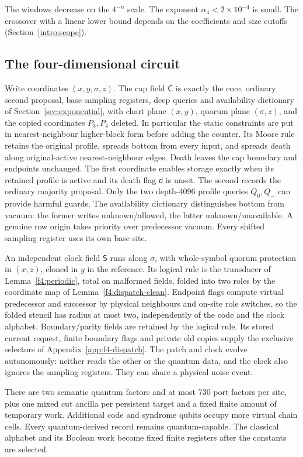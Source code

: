 The windows decrease on the \(4^{-n}\) scale. The exponent \(\alpha_4<2\times10^{-4}\) is small. The crossover with a linear lower bound depends on the coefficients and size cutoffs (Section~\ref{intro:scope}).

\subsection{The four-dimensional circuit}\label{f4:circuit}
Write coordinates \((x,y,\sigma,z)\). The cap field \(\mathsf C\)
is exactly the core, ordinary second proposal, base sampling registers, deep
queries and availability dictionary of Section~\ref{sec:exponential},
with chart plane \((x,y)\), quorum plane \((\sigma,z)\), and the
copied coordinates \(P_3,P_4\) deleted. In particular the static
constraints are put in nearest-neighbour higher-block form before
adding the counter. Its Moore rule retains the original profile, spreads
bottom from every input, and spreads death along original-active
nearest-neighbour edges. Death leaves the cap boundary and endpoints
unchanged. The first coordinate enables storage exactly when its retained profile is active and its death flag \(\mathsf d\) is unset. The second records the ordinary majority proposal. Only the two depth-4096 profile queries \(Q_0,Q_-\) can provide harmful guards. The availability dictionary distinguishes bottom from vacuum: the former writes unknown/allowed, the latter unknown/unavailable. A genuine row origin takes priority over predecessor vacuum. Every shifted sampling register uses its own base site.

An independent clock field \(\mathsf S\) runs along \(\sigma\),
with whole-symbol quorum protection in \((x,z)\), cloned in \(y\)
in the reference. Its logical rule is the transducer of
Lemma~\ref{f4:periodic}, total on malformed fields, folded into two
roles by the coordinate map of Lemma~\ref{f4:dispatch-clean}. Endpoint
flags compute virtual predecessor and successor by physical neighbours
and on-site role switches, so the folded stencil has radius at most two,
independently of the code and the clock alphabet. Boundary/parity
fields are retained by the logical rule. Its stored current request,
finite boundary flags and private old copies supply the exclusive
selectors of Appendix~\ref{app:f4-dispatch}.
The patch and clock evolve autonomously: neither reads the other or the quantum data, and the clock also ignores the sampling registers. They can share a physical noise event.

There are two semantic quantum factors and at most 730 port factors
per site, plus one mixed cut ancilla per persistent target and a fixed
finite amount of temporary work. Additional code and syndrome qubits
occupy more virtual chain cells. Every quantum-derived record remains
quantum-capable. The classical alphabet and its Boolean work become
fixed finite registers after the constants are selected.

